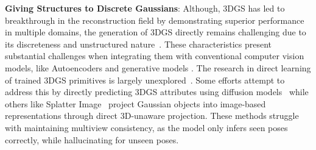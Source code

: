 \noindent\textbf{Giving Structures to Discrete Gaussians}:
Although, 3DGS has led to breakthrough in the reconstruction field by demonstrating superior performance in multiple domains, the generation of 3DGS directly remains challenging due to its discreteness and unstructured nature~\cite{diffgs2024, gaussiancube2024}. 
These characteristics present substantial challenges when integrating them with conventional computer vision models, like Autoencoders and generative models \cite{diffgs2024}.
%
The research in direct learning of trained 3DGS primitives is largely unexplored~\cite{shapesplat2024}. 
%
Some efforts attempt to address this by directly predicting 3DGS attributes using diffusion models~\cite{gsd2024} while others
like Splatter Image~\cite{splatterimage2024} project Gaussian objects into image-based representations through direct 3D-unaware projection. 
These methods struggle with maintaining multiview consistency, as the model only infers seen poses correctly, while hallucinating for unseen poses. 
%



